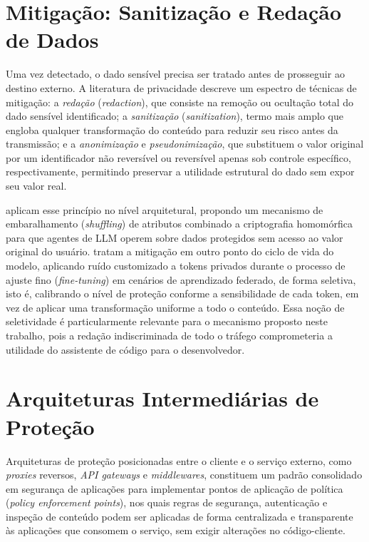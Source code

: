 \section{Mitigação: Sanitização e Redação de Dados}

Uma vez detectado, o dado sensível precisa ser tratado antes de prosseguir ao destino externo. A literatura de privacidade descreve um espectro de técnicas de mitigação: a \textit{redação} (\textit{redaction}), que consiste na remoção ou ocultação total do dado sensível identificado; a \textit{sanitização} (\textit{sanitization}), termo mais amplo que engloba qualquer transformação do conteúdo para reduzir seu risco antes da transmissão; e a \textit{anonimização} e \textit{pseudonimização}, que substituem o valor original por um identificador não reversível ou reversível apenas sob controle específico, respectivamente, permitindo preservar a utilidade estrutural do dado sem expor seu valor real.

 aplicam esse princípio no nível arquitetural, propondo um mecanismo de embaralhamento (\textit{shuffling}) de atributos combinado a criptografia homomórfica para que agentes de LLM operem sobre dados protegidos sem acesso ao valor original do usuário.  tratam a mitigação em outro ponto do ciclo de vida do modelo, aplicando ruído customizado a tokens privados durante o processo de ajuste fino (\textit{fine-tuning}) em cenários de aprendizado federado, de forma seletiva, isto é, calibrando o nível de proteção conforme a sensibilidade de cada token, em vez de aplicar uma transformação uniforme a todo o conteúdo. Essa noção de seletividade é particularmente relevante para o mecanismo proposto neste trabalho, pois a redação indiscriminada de todo o tráfego comprometeria a utilidade do assistente de código para o desenvolvedor.

\section{Arquiteturas Intermediárias de Proteção}

Arquiteturas de proteção posicionadas entre o cliente e o serviço externo, como \textit{proxies} reversos, \textit{API gateways} e \textit{middlewares}, constituem um padrão consolidado em segurança de aplicações para implementar pontos de aplicação de política (\textit{policy enforcement points}), nos quais regras de segurança, autenticação e inspeção de conteúdo podem ser aplicadas de forma centralizada e transparente às aplicações que consomem o serviço, sem exigir alterações no código-cliente.

